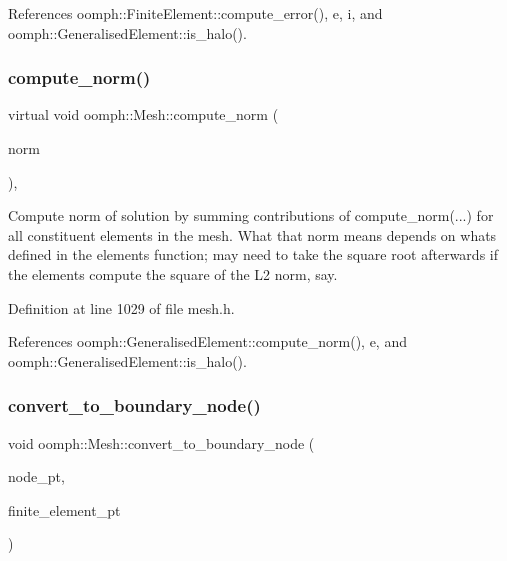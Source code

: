 References oomph\+::\+Finite\+Element\+::compute\+\_\+error(), e, i, and oomph\+::\+Generalised\+Element\+::is\+\_\+halo().

\mbox{\label{classoomph_1_1Mesh_a36ceaaaa59093ae61393a3fd9090469e}} 
\subsubsection{\texorpdfstring{compute\+\_\+norm()}{compute\_norm()}}
{\footnotesize\ttfamily virtual void oomph\+::\+Mesh\+::compute\+\_\+norm (\begin{DoxyParamCaption}\item[{double \&}]{norm }\end{DoxyParamCaption})\hspace{0.3cm}{\ttfamily [inline]}, {\ttfamily [virtual]}}



Compute norm of solution by summing contributions of compute\+\_\+norm(...) for all constituent elements in the mesh. What that norm means depends on what\textquotesingle{}s defined in the element\textquotesingle{}s function; may need to take the square root afterwards if the elements compute the square of the L2 norm, say. 



Definition at line 1029 of file mesh.\+h.



References oomph\+::\+Generalised\+Element\+::compute\+\_\+norm(), e, and oomph\+::\+Generalised\+Element\+::is\+\_\+halo().

\mbox{\label{classoomph_1_1Mesh_a011a55698cbdbe7fbc336be659ff64fc}} 
\subsubsection{\texorpdfstring{convert\+\_\+to\+\_\+boundary\+\_\+node()}{convert\_to\_boundary\_node()}\hspace{0.1cm}{\footnotesize\ttfamily [1/2]}}
{\footnotesize\ttfamily void oomph\+::\+Mesh\+::convert\+\_\+to\+\_\+boundary\+\_\+node (\begin{DoxyParamCaption}\item[{\hyperlink{classoomph_1_1Node}{Node} $\ast$\&}]{node\+\_\+pt,  }\item[{const \hyperlink{classoomph_1_1Vector}{Vector}$<$ \hyperlink{classoomph_1_1FiniteElement}{Finite\+Element} $\ast$$>$ \&}]{finite\+\_\+element\+\_\+pt }\end{DoxyParamCaption})\hspace{0.3cm}{\ttfamily [protected]}}



